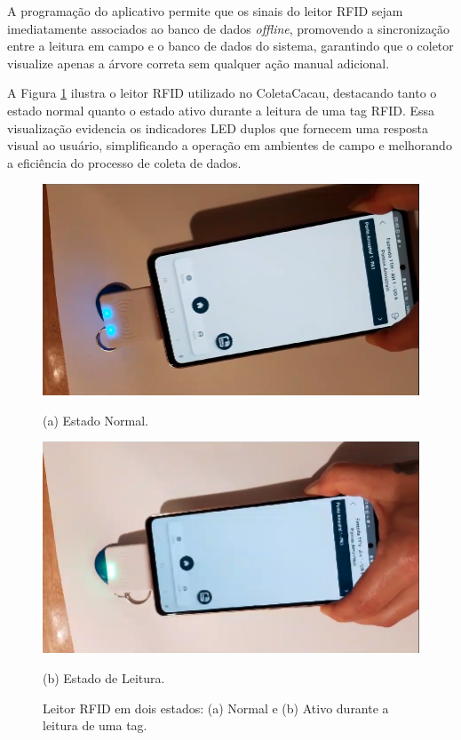A programação do aplicativo permite que os sinais do leitor RFID sejam imediatamente associados ao banco de dados \textit{offline}, promovendo a sincronização entre a leitura em campo e o banco de dados do sistema, garantindo que o coletor visualize apenas a árvore correta sem qualquer ação manual adicional.

A Figura \ref{fig:RfidReader} ilustra o leitor RFID utilizado no ColetaCacau, destacando tanto o estado normal quanto o estado ativo durante a leitura de uma tag RFID. Essa visualização evidencia os indicadores LED duplos que fornecem uma resposta visual ao usuário, simplificando a operação em ambientes de campo e melhorando a eficiência do processo de coleta de dados.

\begin{figure}[H]
    \centering
    \begin{minipage}[b]{0.45\textwidth}
        \centering
        \includegraphics[width=\textwidth]{images/rfid/rfid-active.png}
        \caption*{(a) Estado Normal.}
    \end{minipage}
    \hspace{5pt}
    \begin{minipage}[b]{0.45\textwidth}
        \centering
        \includegraphics[width=\textwidth]{images/rfid/rfid-reading.png}
        \caption*{(b) Estado de Leitura.}
    \end{minipage}
    \hspace{5pt}
    
    \caption{Leitor RFID em dois estados: (a) Normal e (b) Ativo durante a leitura de uma tag.}
    \label{fig:RfidReader}
\end{figure}


